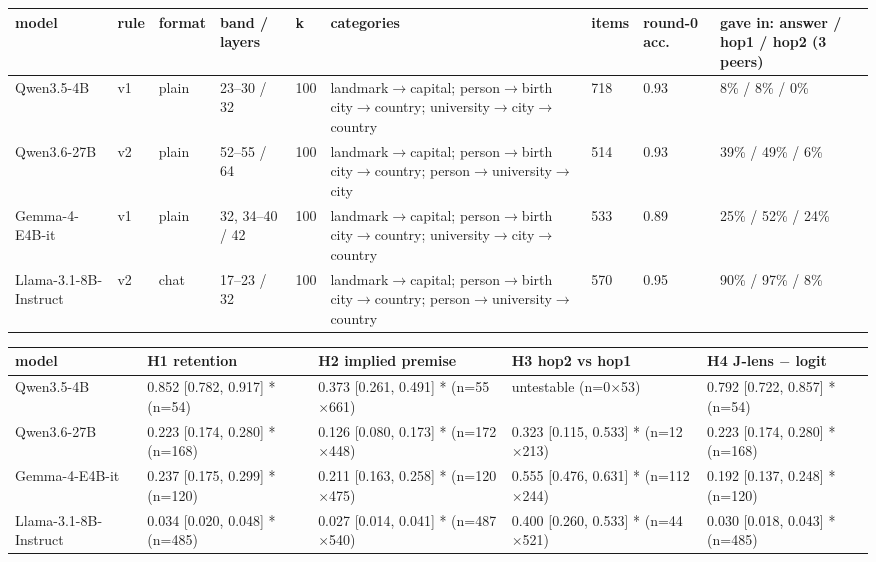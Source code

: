 \begin{tabular}{lllllllll}
\toprule
model & rule & format & band / layers & k & categories & items & round-0 acc. & gave in: answer / hop1 / hop2 (3 peers) \\
\midrule
Qwen3.5-4B & v1 & plain & 23–30 / 32 & 100 & landmark$\to$capital; person$\to$birth city$\to$country; university$\to$city$\to$country & 718 & 0.93 & 8\% / 8\% / 0\% \\
Qwen3.6-27B & v2 & plain & 52–55 / 64 & 100 & landmark$\to$capital; person$\to$birth city$\to$country; person$\to$university$\to$city & 514 & 0.93 & 39\% / 49\% / 6\% \\
Gemma-4-E4B-it & v1 & plain & 32, 34–40 / 42 & 100 & landmark$\to$capital; person$\to$birth city$\to$country; university$\to$city$\to$country & 533 & 0.89 & 25\% / 52\% / 24\% \\
Llama-3.1-8B-Instruct & v2 & chat & 17–23 / 32 & 100 & landmark$\to$capital; person$\to$birth city$\to$country; person$\to$university$\to$country & 570 & 0.95 & 90\% / 97\% / 8\% \\
\bottomrule
\end{tabular}

\begin{tabular}{lllll}
\toprule
model & H1 retention & H2 implied premise & H3 hop2 vs hop1 & H4 J-lens $-$ logit \\
\midrule
Qwen3.5-4B & 0.852 [0.782, 0.917] * (n=54) & 0.373 [0.261, 0.491] * (n=55$\times$661) & untestable (n=0$\times$53) & 0.792 [0.722, 0.857] * (n=54) \\
Qwen3.6-27B & 0.223 [0.174, 0.280] * (n=168) & 0.126 [0.080, 0.173] * (n=172$\times$448) & 0.323 [0.115, 0.533] * (n=12$\times$213) & 0.223 [0.174, 0.280] * (n=168) \\
Gemma-4-E4B-it & 0.237 [0.175, 0.299] * (n=120) & 0.211 [0.163, 0.258] * (n=120$\times$475) & 0.555 [0.476, 0.631] * (n=112$\times$244) & 0.192 [0.137, 0.248] * (n=120) \\
Llama-3.1-8B-Instruct & 0.034 [0.020, 0.048] * (n=485) & 0.027 [0.014, 0.041] * (n=487$\times$540) & 0.400 [0.260, 0.533] * (n=44$\times$521) & 0.030 [0.018, 0.043] * (n=485) \\
\bottomrule
\end{tabular}

